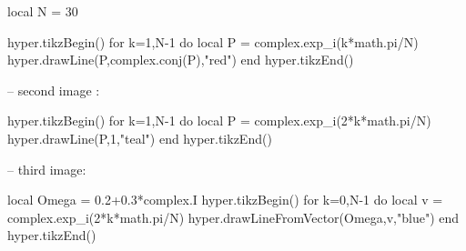 \documentclass[margin=.2cm,multi,tikz]{standalone}
\begin{document}
\begin{luacode*}
local N = 30

hyper.tikzBegin()
for k=1,N-1 do
	local P = complex.exp_i(k*math.pi/N)
	hyper.drawLine(P,complex.conj(P),"red")
end
hyper.tikzEnd()

-- second image :

hyper.tikzBegin()
for k=1,N-1 do
local P = complex.exp_i(2*k*math.pi/N)
hyper.drawLine(P,1,"teal")
end
hyper.tikzEnd()

-- third image:

local Omega = 0.2+0.3*complex.I
hyper.tikzBegin()
for k=0,N-1 do
	local v = complex.exp_i(2*k*math.pi/N)
	hyper.drawLineFromVector(Omega,v,"blue")
end
hyper.tikzEnd()

\end{luacode*}
\end{document}
